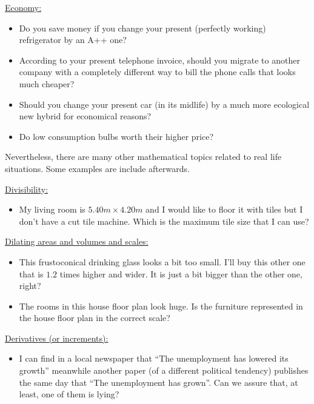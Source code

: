 \documentclass[a4paper]{article} %
\begin{document}
\medskip
\noindent\underline{Economy:}

\begin{itemize}
\item Do you save money if you change your present (perfectly working)
      refrigerator by an A++ one?
\item According to your present telephone invoice, should you migrate to
      another company with a completely different way to bill the phone
      calls that looks much cheaper?
\item Should you change your present car (in its midlife) by a much
      more ecological new hybrid for economical reasons?
\item Do low consumption bulbs worth their higher price?
\end{itemize}

Nevertheless, there are many other mathematical topics related to real life
situations. Some examples are include afterwards.

\medskip
\noindent\underline{Divisibility:}

\begin{itemize}
\item My living room is $5.40m \times 4.20m$ and I would like to floor it with
      tiles but I don't have a cut tile machine. Which is the maximum tile size
      that I can use?
\end{itemize}

\medskip
\noindent\underline{Dilating areas and volumes and scales:}
\begin{itemize}
\item This frustoconical drinking glass looks a bit too small. I'll buy this
      other one that is $1.2$ times higher and wider. It is just a bit bigger
      than the other one, right?
\item The rooms in this house floor plan look huge.
      Is the furniture represented in the house floor plan in the correct scale?
\end{itemize}

\medskip
\noindent\underline{Derivatives (or increments):}
\begin{itemize}
\item I can find in a local newspaper that ``The unemployment has lowered
      its growth'' meanwhile another paper (of a different political tendency)
      publishes the same day that ``The unemployment has grown''.
      Can we assure that, at least, one of them is lying?
\end{itemize}
\end{document}
